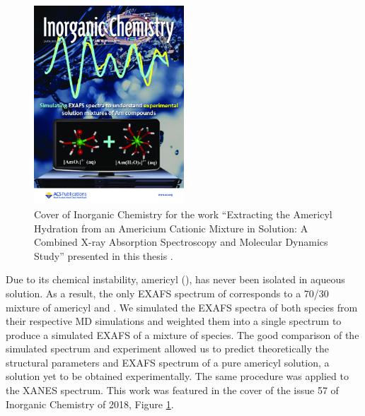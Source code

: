 \begin{figure}[ht!]
     \centering
         \includegraphics[width=0.5\textwidth]{images/cover_IC2018.png} 
        \caption[Cover Inorganic Chemistry]{Cover of Inorganic Chemistry for the work ``Extracting 
the Americyl Hydration from an Americium Cationic Mixture in Solution: A 
Combined X-ray Absorption Spectroscopy and Molecular Dynamics Study'' presented in this thesis
.\cite{Perez-Conesa2018} }
        \label{cover1}
\end{figure}

Due to its chemical instability, americyl (), has never been isolated in aqueous 
solution. As a result, the only EXAFS spectrum of  corresponds to a 70/30 mixture 
of 
americyl and .\cite{JRadioanNucChem_Riddle_2016}  We simulated the 
EXAFS spectra of both species from their respective MD simulations and weighted them into a single 
spectrum to produce a simulated EXAFS 
of a mixture of species\cite{Perez-Conesa2018}. The good comparison of the simulated spectrum 
and experiment allowed us to 
predict theoretically the structural parameters and EXAFS spectrum of a pure americyl solution, a 
solution yet to be obtained experimentally\cite{JPC_SPC_2017}. The same procedure was applied 
to the XANES spectrum. This 
work was featured in the cover of the issue 57 of  Inorganic Chemistry of 2018, Figure
\ref{cover1}.



